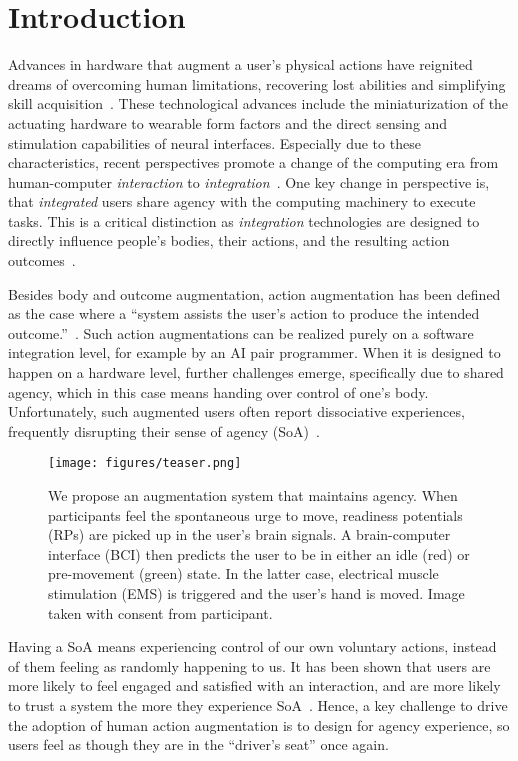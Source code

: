 \section{Introduction}

Advances in hardware that augment a user's physical actions have reignited dreams of overcoming human limitations, recovering lost abilities and simplifying skill acquisition~\citep{Goto2020-mw, Kunze2017-co}. These technological advances include the miniaturization of the actuating hardware to wearable form factors and the direct sensing and stimulation capabilities of neural interfaces. Especially due to these characteristics, recent perspectives promote a change of the computing era from human-computer \textit{interaction} to \textit{integration}~\cite{Mueller2020-dl}. One key change in perspective is, that \textit{integrated} users share agency with the computing machinery to execute tasks. This is a critical distinction as \textit{integration} technologies are designed to directly influence people’s bodies, their actions, and the resulting action outcomes~\cite{Cornelio2022-aq}.

Besides body and outcome augmentation, action augmentation has been defined as the case where a ``system assists the user’s action to produce the intended outcome.''~\cite{Cornelio2022-aq}. Such action augmentations can be realized purely on a software integration level, for example by an AI pair programmer. When it is designed to happen on a hardware level, further challenges emerge, specifically due to shared agency, which in this case means handing over control of one's body. Unfortunately, such augmented users often report dissociative experiences, frequently disrupting their sense of agency (SoA)~\citep{Gilbert2017-ze, Gilbert2019-uc}.


\begin{figure}[h]
    \centering
    \texttt{[image: figures/teaser.png]}%
    \caption{We propose an augmentation system that maintains agency. When participants feel the spontaneous urge to move, readiness potentials (RPs) are picked up in the user's brain signals. A brain-computer interface (BCI) then predicts the user to be in either an idle (red) or pre-movement (green) state. In the latter case, electrical muscle stimulation (EMS) is triggered and the user's hand is moved. Image taken with consent from participant.}
\end{figure}


Having a SoA means experiencing control of our own voluntary actions, instead of them feeling as randomly happening to us. It has been shown that users are more likely to feel engaged and satisfied with an interaction, and are more likely to trust a system the more they experience SoA~\citep{Berberian2012-do, Miller2007-rb}. Hence, a key challenge to drive the adoption of human action augmentation is to design for agency experience, so users feel as though they are in the ``driver's seat'' once again.

